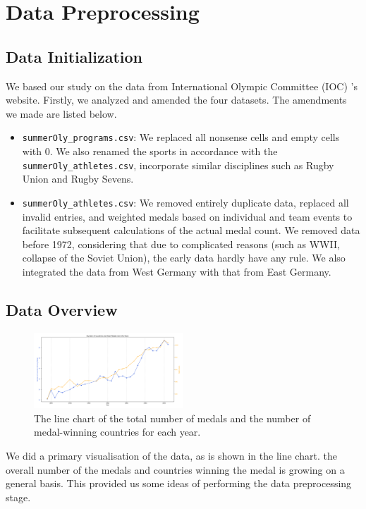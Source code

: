 \documentclass{mcmthesis}
\begin{document}
\section{Data Preprocessing}

\subsection{Data Initialization}
We based our study on the data from International Olympic Committee (IOC) 's website\cite{1}. Firstly, we analyzed and amended the four datasets. The amendments we made are listed below.
\begin{itemize}
\item {\texttt{summerOly\_programs.csv}}: We replaced all nonsense cells and empty cells with 0. We also renamed the sports in accordance with the \texttt{summerOly\_athletes.csv}, incorporate similar disciplines such as Rugby Union and Rugby Sevens.
\item {\texttt{summerOly\_athletes.csv}}: We removed entirely duplicate data, replaced all invalid entries, and weighted medals based on individual and team events to facilitate subsequent calculations of the actual medal count. We removed data before 1972, considering that due to complicated reasons (such as WWII, collapse of the Soviet Union), the early data hardly have any rule. We also integrated the data from West Germany with that from East Germany.
\end{itemize}

\subsection{Data Overview}


\begin{figure}[h!]
    \centering
    \includegraphics[width=0.5\textwidth]{MCM2025_Latex/figures/medal_total&countries_got_them.png}
    \caption{The line chart of the total number of medals and the number of medal-winning countries for each year.}
    \label{fig:medal_total&countries_got_them}
\end{figure}

We did a primary visualisation of the data, as is shown in the line chart. the overall number of the medals and countries winning the medal is growing on a general basis. This provided us some ideas of performing the data preprocessing stage. 
\end{document}
